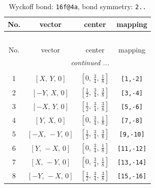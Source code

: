 \documentclass[fleqn,8pt]{jsarticle}
\begin{document}
\begin{longtable}{cccc}
\caption{Wyckoff bond: {\tt 16f@4a}, bond symmetry: {\tt 2..}}
 \\
 \hline \hline
No. & vector & center & mapping \\ \hline \endfirsthead

\multicolumn{3}{l}{\tablename\ \thetable{}} \\
 \hline \hline
No. & vector & center & mapping \\ \hline \endhead

 \hline \hline
\multicolumn{3}{r}{\footnotesize\it continued ...} \\ \endfoot

 \hline \hline
\multicolumn{3}{r}{} \\ \endlastfoot

1 & $\left[ X,\, Y,\, 0 \right]$ & $\left[ 0,\, \frac{3}{4},\, \frac{1}{8} \right]$ & {\tt [1,-2]} \\ \hline
2 & $\left[ - Y,\, X,\, 0 \right]$ & $\left[ \frac{1}{2},\, \frac{3}{4},\, \frac{3}{8} \right]$ & {\tt [3,-4]} \\ \hline
3 & $\left[ - X,\, Y,\, 0 \right]$ & $\left[ \frac{1}{2},\, \frac{3}{4},\, \frac{3}{8} \right]$ & {\tt [5,-6]} \\ \hline
4 & $\left[ Y,\, X,\, 0 \right]$ & $\left[ 0,\, \frac{3}{4},\, \frac{1}{8} \right]$ & {\tt [7,-8]} \\ \hline
5 & $\left[ - X,\, - Y,\, 0 \right]$ & $\left[ \frac{1}{2},\, \frac{3}{4},\, \frac{3}{8} \right]$ & {\tt [9,-10]} \\ \hline
6 & $\left[ Y,\, - X,\, 0 \right]$ & $\left[ 0,\, \frac{3}{4},\, \frac{1}{8} \right]$ & {\tt [11,-12]} \\ \hline
7 & $\left[ X,\, - Y,\, 0 \right]$ & $\left[ 0,\, \frac{3}{4},\, \frac{1}{8} \right]$ & {\tt [13,-14]} \\ \hline
8 & $\left[ - Y,\, - X,\, 0 \right]$ & $\left[ \frac{1}{2},\, \frac{3}{4},\, \frac{3}{8} \right]$ & {\tt [15,-16]} \\
\end{longtable}
\renewcommand{\arraystretch}{1.2}
\end{document}
